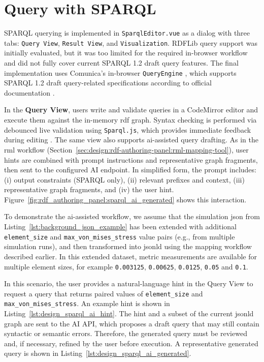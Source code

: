 \newpage

\section{Query with SPARQL}\label{sec:design:query-with-sparql}
SPARQL querying is implemented in \texttt{SparqlEditor.vue} as a dialog with three tabs: \texttt{Query View}, \texttt{Result View}, and \texttt{Visualization}. RDFLib query support was initially evaluated, but it was too limited for the required in-browser workflow and did not fully cover current SPARQL 1.2 draft query features. The final implementation uses Comunica's in-browser \texttt{QueryEngine} \cite{comunica_query_sparql}, which supports SPARQL 1.2 draft query-related specifications according to official documentation \cite{comunica_supported_specs}.

In the \textbf{Query View}, users write and validate queries in a CodeMirror editor \cite{codemirror} and execute them against the in-memory \gls{rdf} graph. Syntax checking is performed via debounced live validation using \texttt{Sparql.js}, which provides immediate feedback during editing \cite{sparqljs}. The same view also supports \gls{ai}-assisted query drafting. As in the \gls{rml} workflow (Section~\ref{sec:design:rdf-authoring-panel:rml-mapping-tool}), user hints are combined with prompt instructions and representative graph fragments, then sent to the configured AI endpoint. In simplified form, the prompt includes: (i) output constraints (SPARQL only), (ii) relevant prefixes and context, (iii) representative graph fragments, and (iv) the user hint. Figure~\ref{fig:rdf_authoring_panel:sparql_ai_generated} shows this interaction.

To demonstrate the \gls{ai}-assisted workflow, we assume that the simulation \gls{json} from Listing~\ref{lst:background_json_example} has been extended with additional \texttt{element\_size} and \texttt{max\_von\_mises\_stress} value pairs (e.g., from multiple simulation runs), and then transformed into \gls{jsonld} using the mapping workflow described earlier. In this extended dataset, metric measurements are available for multiple element sizes, for example \texttt{0.003125}, \texttt{0.00625}, \texttt{0.0125}, \texttt{0.05} and \texttt{0.1}.

In this scenario, the user provides a natural-language hint in the Query View to request a query that returns paired values of \texttt{element\_size} and \texttt{max\_von\_mises\_stress}. An example hint is shown in Listing~\ref{lst:design_sparql_ai_hint}. The hint and a subset of the current \gls{jsonld} graph are sent to the AI API, which proposes a draft query that may still contain syntactic or semantic errors. Therefore, the generated query must be reviewed and, if necessary, refined by the user before execution. A representative generated query is shown in Listing~\ref{lst:design_sparql_ai_generated}.

